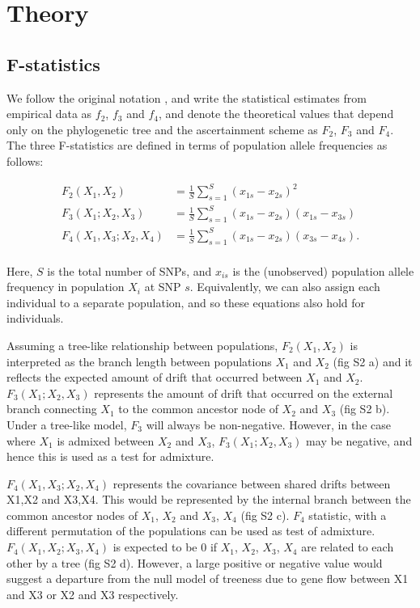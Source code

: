 \documentclass[12pt, letterpaper]{article}
\begin{document}
\section{Theory}

\subsection{F-statistics}
We follow the original notation \cite{patterson_ancient_2012}, and write the statistical estimates from empirical data as $f_2$, $f_3$ and $f_4$, and denote the theoretical values that depend only on the phylogenetic tree and the ascertainment scheme as $F_2$, $F_3$ and $F_4$. The three F-statistics are defined in terms of population allele frequencies as follows:

\begin{align}\label{eq:f_intro}
F_2(X_1,X_2) &= \frac{1}{S}\sum_{s=1}^S(x_{1s} - x_{2s})^2\nonumber\\
F_3(X_1;X_2,X_3) &= \frac{1}{S}\sum_{s=1}^S(x_{1s} - x_{2s})(x_{1s} - x_{3s})\nonumber\\
F_4(X_1,X_3;X_2,X_4) &= \frac{1}{S}\sum_{s=1}^S(x_{1s} - x_{2s})(x_{3s} - x_{4s}).\nonumber\\
\end{align}

Here, $S$ is the total number of SNPs, and $x_{is}$ is the (unobserved) population allele frequency in population $X_i$ at SNP $s$. Equivalently, we can also assign each individual to a separate population, and so these equations also hold for individuals.

Assuming a tree-like relationship between populations, $F_2(X_1,X_2)$ is interpreted as the branch length between populations $X_1$ and $X_2$ (fig S2 a) and it reflects the expected amount of drift that occurred between $X_1$ and $X_2$. $F_3(X_1;X_2,X_3)$ represents the amount of drift that occurred on the external branch connecting $X_1$ to the common ancestor node of $X_2$ and $X_3$ (fig S2 b). Under a tree-like model, $F_3$ will always be non-negative. However, in the case where $X_1$ is admixed between $X_2$ and $X_3$, $F_3(X_1;X_2,X_3)$ may be negative, and hence this is used as a test for admixture\cite{peter_admixture_2016, patterson_ancient_2012}. 

$F_4(X_1,X_3;X_2,X_4)$ represents the covariance between shared drifts between X1,X2 and X3,X4. This would be represented by the internal branch between the common ancestor nodes of $X_1$, $X_2$ and $X_3$, $X_4$ (fig S2 c). $F_4$ statistic, with a different permutation of the populations can be used as test of admixture. $F_4(X_1,X_2;X_3,X_4)$ is expected to be 0 if $X_1$, $X_2$, $X_3$, $X_4$ are related to each other by a tree (fig S2 d). However, a large positive or negative value would suggest a departure from the null model of treeness due to gene flow between X1 and X3 or X2 and X3 respectively.
\end{document}
